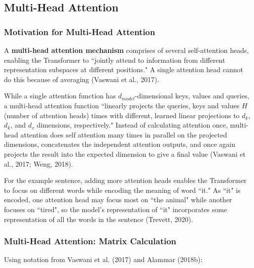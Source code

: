 \subsection{Multi-Head Attention} \label{sec:MultiHeadAttention}

\subsubsection{Motivation for Multi-Head Attention}


A \textbf{multi-head attention mechanism} comprises of several self-attention heads, enabling the Transformer to ``jointly attend to information from different representation subspaces at different positions." A single attention head cannot do this because of averaging (Vaswani et al., 2017). \newline

While a single attention function has $d_{model}$-dimensional keys, values and queries, a multi-head attention function ``linearly projects the queries, keys and values $H$ (number of attention heads) times with different, learned linear projections to $d_k$, $d_k$, and $d_v$ dimensions, respectively." Instead of calculating attention once, multi-head attention does self attention many times in parallel on the projected dimensions, concatenates the independent attention outputs, and once again projects the result into the expected dimension to give a final value (Vaswani et al., 2017; Weng, 2018).\newline 

For the example sentence, adding more attention heads enables the Transformer to focus on different words while encoding the meaning of word ``it." As ``it" is encoded, one attention head may focus most on ``the animal" while another focuses on ``tired", so the model's representation of ``it" incorporates some representation of all the words in the sentence (Trevett, 2020). 

\subsubsection{Multi-Head Attention: Matrix Calculation}

Using notation from Vaswani et al. (2017) and Alammar (2018b): 

